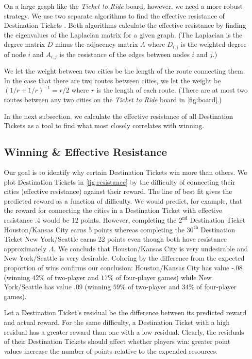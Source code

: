 On a large graph like the \textit{Ticket to Ride}
board, however, we need a more robust strategy.
We use two separate algorithms to find the effective resistance
of Destination Tickets
\cite{ellens2011effective, wu2004theory}.
Both algorithms calculate the effective resistance by finding 
the eigenvalues of the Laplacian matrix for a given graph.
(The Laplacian is the degree matrix $D$ minus the adjacency
matrix $A$ where $D_{i,i}$ is the weighted degree of node $i$
and $A_{i,j}$ is the resistance of the edges between nodes
$i$ and $j$.)

We let the weight between two cities be the length
of the route connecting them.
In the case that there are two routes between cities,
we let the weight be $(1/r + 1/r)^{-1}=r/2$ where
$r$ is the length of each route.
(There are at most two routes between any two cities
on the \textit{Ticket to Ride} board 
in \cref{fig:board}.)

In the next subsection, we calculate the effective
resistance of all Destination Tickets as a tool
to find what most closely correlates with winning.

\subsection{Winning \& Effective Resistance}
\label{sec:winning_and_resistance}

Our goal is to identify why certain Destination
Tickets win more than others.
We plot Destination Tickets in \cref{fig:resistance}
by the difficulty of connecting their cities (effective
resistance) against their reward.
The line of best fit gives the predicted reward
as a function of difficulty.
We would predict, for example, that the reward for 
connecting the cities
in a Destination Ticket with effective resistance .4 would
be 12 points.
However, completing the $2^\text{nd}$ Destination Ticket 
Houston/Kansas City earns 5 points whereas
completing the $30^\text{th}$ Destination Ticket
New York/Seattle earns 22 points even though
both have resistance approximately .4.
We conclude that Houston/Kansas City is very undesirable
and New York/Seattle is very desirable.
Coloring by the difference from the expected proportion
of wins confirms our conclusion:
Houston/Kansas City has value -.08 (winning $42\%$ of
two-player and $17\%$ of four-player games) while
New York/Seattle has value .09 (winning $59\%$ of
two-player and $34\%$ of four-player games).

Let a Destination Ticket's residual be the difference
between its predicted reward and actual reward.
For the same difficulty, a Destination Ticket
with a high residual has a greater reward
than one with a low residual.
Clearly, the residuals of their Destination Tickets
should affect whether players win: greater point values
increase the number of points relative to the expended
resources.


